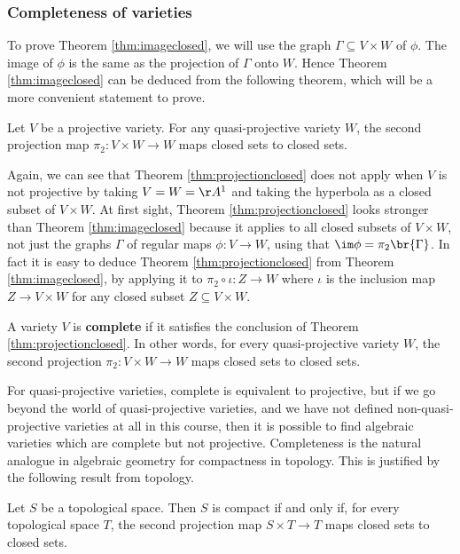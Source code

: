 \subsubsection{Completeness of varieties}

To prove Theorem \ref{thm:imageclosed}, we will use the graph $ \Gamma \subseteq V \times W $ of $ \phi $. The image of $ \phi $ is the same as the projection of $ \Gamma $ onto $ W $. Hence Theorem \ref{thm:imageclosed} can be deduced from the following theorem, which will be a more convenient statement to prove.

\begin{theorem}
\label{thm:projectionclosed}
Let $ V $ be a projective variety. For any quasi-projective variety $ W $, the second projection map $ \pi_2 : V \times W \to W $ maps closed sets to closed sets.
\end{theorem}

Again, we can see that Theorem \ref{thm:projectionclosed} does not apply when $ V $ is not projective by taking $ V = W = \AA^1 $ and taking the hyperbola as a closed subset of $ V \times W $. At first sight, Theorem \ref{thm:projectionclosed} looks stronger than Theorem \ref{thm:imageclosed} because it applies to all closed subsets of $ V \times W $, not just the graphs $ \Gamma $ of regular maps $ \phi : V \to W $, using that $ \im \phi = \pi_2\br{\Gamma} $. In fact it is easy to deduce Theorem \ref{thm:projectionclosed} from Theorem \ref{thm:imageclosed}, by applying it to $ \pi_2 \circ \iota : Z \to W $ where $ \iota $ is the inclusion map $ Z \to V \times W $ for any closed subset $ Z \subseteq V \times W $.

\begin{definition*}
A variety $ V $ is \textbf{complete} if it satisfies the conclusion of Theorem \ref{thm:projectionclosed}. In other words, for every quasi-projective variety $ W $, the second projection $ \pi_2 : V \times W \to W $ maps closed sets to closed sets.
\end{definition*}

For quasi-projective varieties, complete is equivalent to projective, but if we go beyond the world of quasi-projective varieties, and we have not defined non-quasi-projective varieties at all in this course, then it is possible to find algebraic varieties which are complete but not projective. Completeness is the natural analogue in algebraic geometry for compactness in topology. This is justified by the following result from topology.

\begin{lemma}
\label{lem:projectionclosed}
Let $ S $ be a topological space. Then $ S $ is compact if and only if, for every topological space $ T $, the second projection map $ S \times T \to T $ maps closed sets to closed sets.
\end{lemma}

